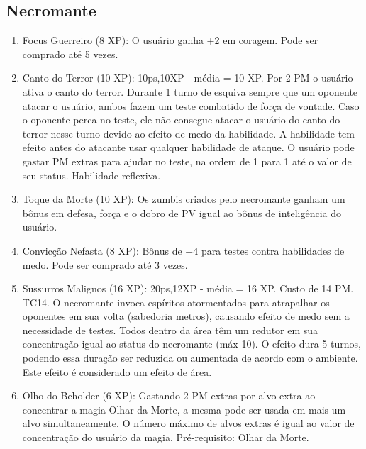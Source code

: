   
  
  \subsection{Necromante}
  
  
\begin{enumerate}

 	\item Focus Guerreiro (8 XP): O usuário ganha +2 em coragem. Pode ser comprado até 5 vezes.

	\item Canto do Terror (10 XP): 10ps,10XP - média = 10 XP. Por 2 PM o usuário ativa o canto do terror. Durante 1 turno de esquiva sempre que um oponente atacar o usuário, ambos fazem um teste combatido de força de vontade. Caso o oponente perca no teste, ele não consegue atacar o usuário do canto do terror nesse turno devido ao efeito de medo da habilidade. A habilidade tem efeito antes do atacante usar qualquer habilidade de ataque. O usuário pode gastar PM extras para ajudar no teste, na ordem de 1 para 1 até o valor de seu status. Habilidade reflexiva.
			
  \item Toque da Morte (10 XP): Os zumbis criados pelo necromante ganham um bônus em defesa, força e o dobro de PV igual ao bônus de inteligência do usuário. 

	\item Convicção Nefasta (8 XP): Bônus de +4 para testes contra habilidades de medo. Pode ser comprado até 3 vezes.
 
  \item Sussurros Malignos (16 XP): 20ps,12XP - média = 16 XP. Custo de 14 PM. TC14.\newline 
  O necromante invoca espíritos atormentados para atrapalhar os oponentes em sua volta (sabedoria metros), causando efeito de medo sem a necessidade de testes. Todos dentro da área têm um redutor em sua concentração igual ao status do necromante (máx 10). O efeito dura 5 turnos, podendo essa duração ser reduzida ou aumentada de acordo com o ambiente. Este efeito é considerado um efeito de área.

	\item Olho do Beholder (6 XP): Gastando 2 PM extras por alvo extra ao concentrar a magia Olhar da Morte, a mesma pode ser usada em mais um alvo simultaneamente. O número máximo de alvos extras é igual ao valor de concentração do usuário da magia. Pré-requisito: Olhar da Morte.


\end{enumerate}
